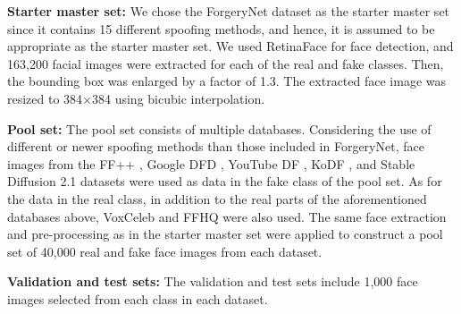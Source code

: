 \documentclass[english]{lni}
\begin{document}
\noindent
\textbf{Starter master set:} We chose the ForgeryNet dataset as the starter master set since it contains 15 different spoofing methods, and hence, it is assumed to be appropriate as the starter master set. We used RetinaFace \cite{9157330} for face detection, and 163,200 facial images were extracted for each of the real and fake classes. Then, the bounding box was enlarged by a factor of 1.3. The extracted face image was resized to 384$\times$384 using bicubic interpolation.


\noindent
\textbf{Pool set:} The pool set consists of multiple databases. Considering the use of different or newer spoofing methods than those included in ForgeryNet, face images from the FF++ \cite{rossler2019faceforensics++}, Google DFD \cite{googledfd}, YouTube DF \cite{kukanov2020cost}, KoDF \cite{kwon2021kodf}, and Stable Diffusion 2.1 \cite{rombach2022high} datasets were used as data in the fake class of the pool set. As for the data in the real class, in addition to the real parts of the aforementioned databases above, VoxCeleb \cite{chung2018voxceleb2} and FFHQ \cite{karras2019style} were also used. The same face extraction and pre-processing as in the starter master set were applied to construct a pool set of 40,000 real and fake face images from each dataset.

\noindent
\textbf{Validation and test sets:} The validation and test sets include 1,000 face images selected from each class in each dataset.
\end{document}
